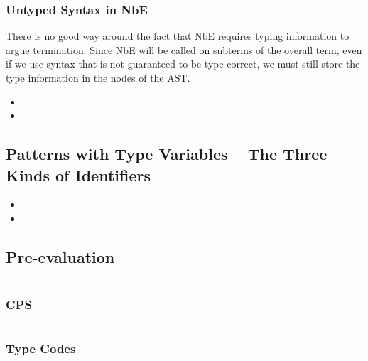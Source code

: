 \subsubsection{Untyped Syntax in NbE}
There is no good way around the fact that NbE requires typing information to argue termination.
Since NbE will be called on subterms of the overall term, even if we use syntax that is not guaranteed to be type-correct, we must still store the type information in the nodes of the AST.




\begin{itemize}
\item {}
\item {}
\end{itemize}

\subsection{Patterns with Type Variables -- The Three Kinds of Identifiers}
\begin{itemize}
\item {}
\item {}
\end{itemize}

\subsection{Pre-evaluation}
$\left.\right.$
\subsubsection{CPS}
$\left.\right.$
\subsubsection{Type Codes}
$\left.\right.$
